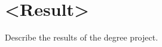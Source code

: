 \documentclass[/home/francois/latex/report/main.tex]{subfiles}
\begin{document}
\chapter{<Result>}
Describe the results of the degree project.
\end{document}
